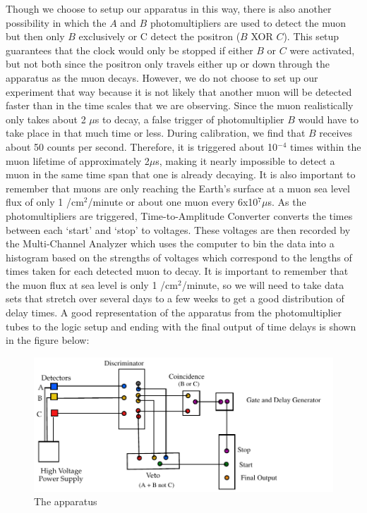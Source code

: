 Though we choose to setup our apparatus in this way, there is also another possibility in which the $A$ and $B$ photomultipliers are used to detect the muon but then only $B$ exclusively or C detect the positron ($B$ XOR $C$). This setup guarantees that the clock would only be stopped if either $B$ or $C$ were activated, but not both since the positron only travels either up or down through the apparatus as the muon decays. However, we do not choose to set up our experiment that way because it is not likely that another muon will be detected faster than in the time scales that we are observing. Since the muon realistically only takes about 2 $\mu$s to decay, a false trigger of photomultiplier $B$ would have to take place in that much time or less. During calibration, we find that $B$ receives about 50 counts per second. Therefore, it is triggered about 10$^{-4}$ times within the muon lifetime of approximately 2$\mu$s, making it nearly impossible to detect a muon in the same time span that one is already decaying. It is also important to remember that muons are only reaching the Earth's surface at a  muon sea level flux of only 1 /cm$^2$/minute or about one muon every 6x10$^7\mu$s.
\newline \indent As the photomultipliers are triggered, Time-to-Amplitude Converter converts the times between each `start' and `stop'  to voltages. These voltages are then recorded by the Multi-Channel Analyzer which uses the computer to bin the data into a histogram based on the strengths of voltages which correspond to the lengths of times taken for each detected muon to decay. It is important to remember that the muon flux at sea level is only 1 /cm$^2$/minute, so we will need to take data sets that stretch over several days to a few weeks to get a good distribution of delay times. A good representation of the apparatus from the photomultiplier tubes to the logic setup and ending with the final output of time delays is shown in the figure below: 


\begin{figure}[H]
\begin{center}
\includegraphics[width=6 in]{ML-figure1.pdf}
\caption{The apparatus}
\end{center}
\end{figure}

